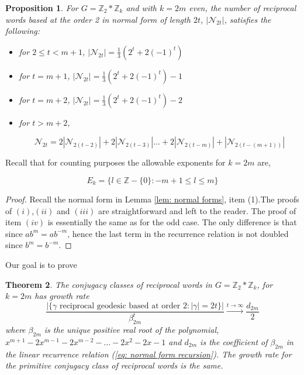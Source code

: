 \documentclass[11pt]{amsart}
\numberwithin{equation}{section}
\theoremstyle{plain}
\newtheorem{thm}{Theorem}[section]
\newtheorem{prop}[thm]{Proposition}
\begin{document}
\begin{prop}\label{thm:recurrence relation even k}
	For $G=\mathbb{Z}_{2} * \mathbb{Z}_{k}$ and  with 
	$k=2m$ even, the number of reciprocal words based at the order 2  in normal form of length $2t$, 
	$|\mathcal{N}_{2t}|$, satisfies the following:
	
	\begin{itemize}
		\item [(i)]  for $2 \leq t < m + 1$, $|\mathcal{N}_{2t}| = \frac{1}{3}(2^{t}+2(-1)^{t})$
		\item [(ii)]  for $t = m + 1$, $|\mathcal{N}_{2t}| = \frac{1}{3}(2^{t}+2(-1)^{t}) - 1$
		\item [(iii)]  for $t = m + 2$, $|\mathcal{N}_{2t}| = \frac{1}{3}(2^{t}+2(-1)^{t}) - 2$
		\item [(iv)]  for $t > m + 2$, 

\begin{equation}\label{eq: normal form recursion}
\mathcal{N}_{2t} = 2|\mathcal{N}_{2(t-2)}|  + 2|\mathcal{N}_{2(t-3)}|  \dots + 2|\mathcal{N}_{2(t-m)}| + |\mathcal{N}_{2(t-(m+1))}|
\end{equation}
		
	\end{itemize}
	
	
\end{prop}






Recall that for counting purposes the  allowable exponents for $k=2m$ are,


\begin{displaymath}
E_k=\{l \in \mathbb{Z}-\{0\} : -m+1 \leq l  \leq m \}
\end{displaymath}


\begin{proof} Recall the normal form in Lemma \ref{lem: normal forms}, item (1).The proofs of $(i)$,$(ii)$ and $(iii)$ are straightforward and left  to  the reader.  The proof of item $(iv)$ is essentially the same as for  the odd case. The only difference is that since
$ab^{m}=ab^{-m}$,  hence the last term in the recurrence relation is not doubled since $b^{m}=b^{-m}$.  \end{proof}

Our goal  is to prove


\begin{thm}\label{thm:binetz2zkevenforrecursion}
The conjugacy classes of reciprocal words in 
   $G=\mathbb{Z}_{2} * \mathbb{Z}_{k}$,  for  $k=2m$ has growth rate
  \begin{equation}
\frac{|\{\gamma \text{ reciprocal geodesic based at order } 2:
|\gamma|=2t\}|}
{\beta_{2m}^{t}} \xrightarrow{t\to\infty} \frac{d_{2m}}{2}
\end{equation}
where  $\beta_{2m}$ is  the unique positive real root of the polynomial, $x^{m+1} -2x^{m-1} -2x^{m-2} - \dots -2x^{2} -2x-1$ and $d_{2m}$ is the coefficient of $\beta_{2m}$ in the 
   linear recurrence relation (\ref{eq: normal form recursion}).
   The growth rate for the primitive conjugacy class of reciprocal words 
   is the same. 
  \end{thm}
  
\end{document}
